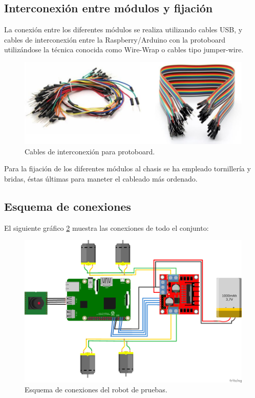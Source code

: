 \subsection{Interconexión entre módulos y fijación}

La conexión entre los diferentes módulos se realiza utilizando cables USB, y cables de interconexión entre la Raspberry/Arduino con la protoboard utilizándose la técnica
conocida como Wire-Wrap o cables tipo jumper-wire.\\

\begin{figure}[H]
  \begin{center}
    \includegraphics[scale=0.3]{imagenes/cables_interconexion.png}
  \end{center}
  \caption{Cables de interconexión para protoboard.}
  \label{figura:cables_interconexion}
\end{figure}

Para la fijación de los diferentes módulos al chasis se ha empleado tornillería y bridas, éstas últimas para maneter el cableado más ordenado.\\

\subsection{Esquema de conexiones}

El siguiente gráfico \ref{diagrama:esquema-conexiones} muestra las conexiones de todo el conjunto:

\begin{figure}[H]
  \includegraphics[scale=0.55]{imagenes/robot/robot-esquema2.png}
  \caption{Esquema de conexiones del robot de pruebas.}
  \label{diagrama:esquema-conexiones}
\end{figure}


